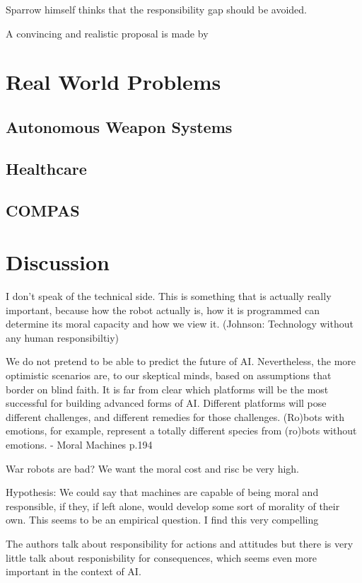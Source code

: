 \documentclass{article}
\newcounter{example}
\begin{document}
\newpage
Sparrow himself thinks that the responsibility gap should be avoided.

A convincing and realistic proposal is made by 

\section{Real World Problems}
\subsection{Autonomous Weapon Systems}
\subsection{Healthcare}
\subsection{COMPAS}
\section{Discussion}

I don't speak of the technical side. This is something that is actually really
important, because how the robot actually is, how it is programmed can determine
its moral capacity and how we view it. (Johnson: Technology without any human
responsibiltiy)


We do not pretend to be able to predict the future of AI. Nevertheless, the 
more optimistic scenarios are, to our skeptical minds, based on assumptions 
that border on blind faith. It is far from clear which platforms will be the most 
successful for building advanced forms of AI. Different platforms will pose 
different challenges, and different remedies for those challenges. (Ro)bots 
with emotions, for example, represent a totally different species from (ro)bots 
without emotions. - Moral Machines p.194

War robots are bad? We want the moral cost and risc be very high.

Hypothesis: We could say that machines are capable of being moral and
responsible, if they, if left alone, would develop some sort of morality of
their own. This seems to be an empirical question. I find this very compelling

The authors talk about responsibility for actions and attitudes but there is
very little talk about responisbility for consequences, which seems even more
important in the context of AI.
\end{document}
